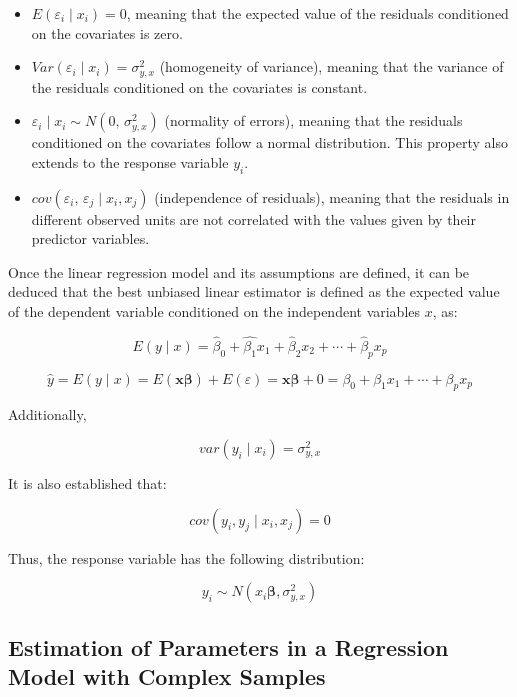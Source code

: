 \documentclass[
  12pt,
]{book}
\providecommand{\tightlist}{%
  \setlength{\itemsep}{0pt}\setlength{\parskip}{0pt}}
\begin{document}
\begin{itemize}
\tightlist
\item
  \(E\left(\varepsilon_{i}\mid x_{i}\right)=0\), meaning that the expected value of the residuals conditioned on the covariates is zero.
\item
  \(Var\left(\varepsilon_{i}\mid x_{i}\right)=\sigma_{y,x}^{2}\) (homogeneity of variance), meaning that the variance of the residuals conditioned on the covariates is constant.
\item
  \(\varepsilon_{i}\mid x_{i}\sim N\left(0,\,\sigma_{y,x}^{2}\right)\) (normality of errors), meaning that the residuals conditioned on the covariates follow a normal distribution. This property also extends to the response variable \(y_{i}\).
\item
  \(cov\left(\varepsilon_{i},\,\varepsilon_{j}\mid x_{i},x_{j}\right)\) (independence of residuals), meaning that the residuals in different observed units are not correlated with the values given by their predictor variables.
\end{itemize}

Once the linear regression model and its assumptions are defined, it can be deduced that the best unbiased linear estimator is defined as the expected value of the dependent variable conditioned on the independent variables \(x\), as:

\[
E\left(y\mid x\right)=\hat{\beta}_{0}+\hat{\beta_{1}}x_{1}+\hat{\beta}_{2}x_{2}+\cdots+\hat{\beta}_{p}x_{p}
\]

\[
\hat{y}  =  E\left(y\mid x\right)
 =  E\left(\boldsymbol{x}\boldsymbol{\beta}\right)+E\left(\varepsilon\right)
=  \boldsymbol{x}\boldsymbol{\beta}+0
  =  \beta_{0}+\beta_{1}x_{1}+\cdots+\beta_{p}x_{p}
\]

Additionally,

\[
var\left(y_{i}\mid x_{i}\right)  =  \sigma_{y,x}^{2}
\]

It is also established that:

\[
cov\left(y_{i},y_{j}\mid x_{i},x_{j}\right)  = 0
\]

Thus, the response variable has the following distribution:

\[
y_{i}  \sim  N\left(x_{i}\boldsymbol{\beta},\sigma_{y,x}^{2}\right)
\]

\hypertarget{estimation-of-parameters-in-a-regression-model-with-complex-samples}{%
\subsection{Estimation of Parameters in a Regression Model with Complex Samples}\label{estimation-of-parameters-in-a-regression-model-with-complex-samples}}
\end{document}
